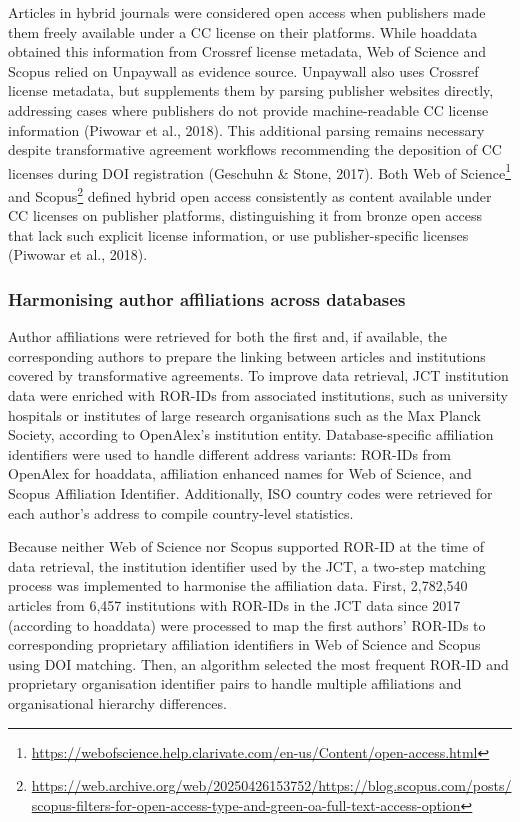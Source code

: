 \documentclass[a4paper,man,floatsintext,longtable,noextraspace,10pt]{apa6}
\begin{document}
Articles in hybrid journals were considered open access when publishers
made them freely available under a CC license on their platforms. While
hoaddata obtained this information from Crossref license metadata, Web
of Science and Scopus relied on Unpaywall as evidence source. Unpaywall
also uses Crossref license metadata, but supplements them by parsing
publisher websites directly, addressing cases where publishers do not
provide machine-readable CC license information (Piwowar et al., 2018).
This additional parsing remains necessary despite transformative
agreement workflows recommending the deposition of CC licenses during
DOI registration (Geschuhn \& Stone, 2017). Both Web of
Science\footnote{\url{https://webofscience.help.clarivate.com/en-us/Content/open-access.html}}
and Scopus\footnote{\url{https://web.archive.org/web/20250426153752/https://blog.scopus.com/posts/scopus-filters-for-open-access-type-and-green-oa-full-text-access-option}}
defined hybrid open access consistently as content available under CC
licenses on publisher platforms, distinguishing it from bronze open
access that lack such explicit license information, or use
publisher-specific licenses (Piwowar et al., 2018).

\subsubsection{Harmonising author affiliations across
databases}\label{harmonising-author-affiliations-across-databases}

Author affiliations were retrieved for both the first and, if available,
the corresponding authors to prepare the linking between articles and
institutions covered by transformative agreements. To improve data
retrieval, JCT institution data were enriched with ROR-IDs from
associated institutions, such as university hospitals or institutes of
large research organisations such as the Max Planck Society, according
to OpenAlex's institution entity. Database-specific affiliation
identifiers were used to handle different address variants: ROR-IDs from
OpenAlex for hoaddata, affiliation enhanced names for Web of Science,
and Scopus Affiliation Identifier. Additionally, ISO country codes were
retrieved for each author's address to compile country-level statistics.

Because neither Web of Science nor Scopus supported ROR-ID at the time
of data retrieval, the institution identifier used by the JCT, a
two-step matching process was implemented to harmonise the affiliation
data. First, 2,782,540 articles from 6,457 institutions with ROR-IDs in
the JCT data since 2017 (according to hoaddata) were processed to map
the first authors' ROR-IDs to corresponding proprietary affiliation
identifiers in Web of Science and Scopus using DOI matching. Then, an
algorithm selected the most frequent ROR-ID and proprietary organisation
identifier pairs to handle multiple affiliations and organisational
hierarchy differences.
\end{document}
